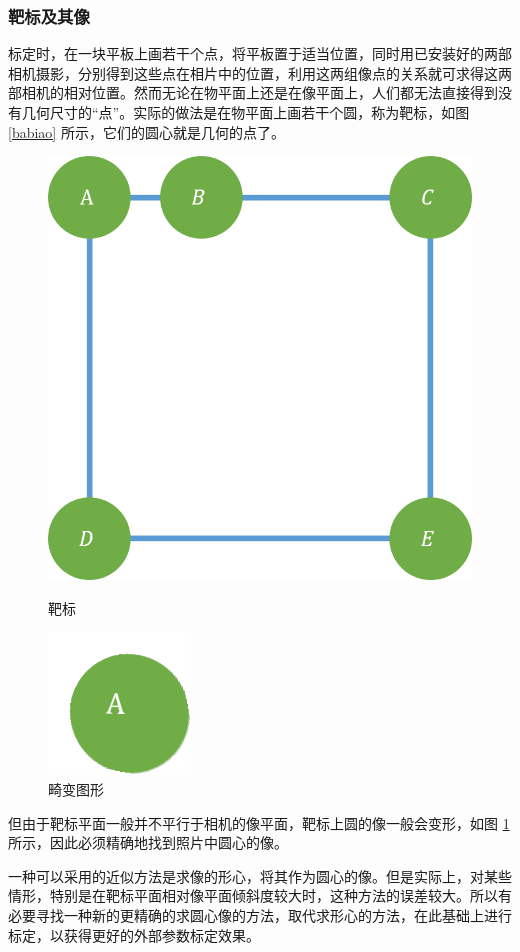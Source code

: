 \documentclass{article}
\numberwithin{equation}{section}						%
\numberwithin{figure}{section}							%
\begin{document}
\begin{sloppypar}
	\subsubsection{靶标及其像}
	标定时，在一块平板上画若干个点，将平板置于适当位置，同时用已安装好的两部相机摄影，分别得到这些点在相片中的位置，利用这两组像点的关系就可求得这两部相机的相对位置。然而无论在物平面上还是在像平面上，人们都无法直接得到没有几何尺寸的“点”。实际的做法是在物平面上画若干个圆，称为靶标，如图 \ref{babiao} 所示，它们的圆心就是几何的点了。
	\begin{figure}[H]
		\begin{minipage}{0.5\linewidth}
			\centering
			\includegraphics[width=0.7\linewidth]{babiao}
			\caption{靶标}
			\label{babiao}
		\end{minipage}
		\begin{minipage}{0.5\linewidth}
			\centering
			\includegraphics[width=0.25\linewidth]{babiao_A_change}
			\caption{畸变图形}
			\label{babiao_A_change}
		\end{minipage}
	\end{figure}
	
	但由于靶标平面一般并不平行于相机的像平面，靶标上圆的像一般会变形，如图 \ref{babiao_A_change} 所示，因此必须精确地找到照片中圆心的像。
	
	一种可以采用的近似方法是求像的形心，将其作为圆心的像。但是实际上，对某些情形，特别是在靶标平面相对像平面倾斜度较大时，这种方法的误差较大。所以有必要寻找一种新的更精确的求圆心像的方法，取代求形心的方法，在此基础上进行标定，以获得更好的外部参数标定效果。
	

\end{sloppypar}
\end{document}
